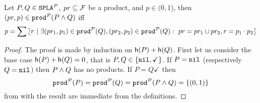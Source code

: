 \blem\label{lem:paral}
Let $P,Q\in\mathtt{SPLA{^{\cal P}}}$, $pr\subseteq{\cal F}$ be a product, and
$p\in(0,1$), then $(pr,p)\in\mathtt{prod}^{\cal P}(P\mathbin{\wedge} Q)$ iff
\begin{displaymath}
  p = \sum\lbag r\ |\ \exists (pr_{1},p_{1})\in\mathtt{prod}^{\cal P}(Q),
  (pr_{2},p_{2})\in\mathtt{prod}^{\cal P}(Q):\ pr=pr_{1}\cup pr_{2}, r=p_{1}\cdot p_{2}\rbag
\end{displaymath}
\begin{proof}
  The proof is made by induction on \(\mathsf{h}(P)+\mathsf{h}(Q)\).
  First let us consider the base case \(\mathsf{h}(P)+\mathsf{h}(Q)=0\),
  that is \(P,Q\in\{\mathtt{nil},\checkmark\}\).
  If $P=\mathtt{nil}$ (respectively \(Q=\mathtt{nil}\)) then
  \(P\mathbin{\wedge} Q\) has no products. If $P=Q\checkmark$ then
  \begin{displaymath}
    \mathtt{prod}^{\cal P}(P)=\mathtt{prod}^{\cal P}(Q)=\mathtt{prod}^{\cal P}(P\mathbin{\wedge} Q)=\{(0,1)\}
  \end{displaymath}
  from with the result
  are immediate from the definitions.


\end{proof}
